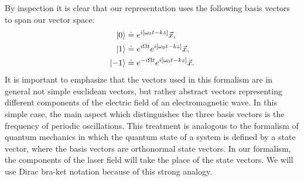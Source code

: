 By inspection it is clear that our representation uses the following basis vectors to span our vector space:
\begin{align}
\left| 0 \right>&\doteq e^{i[\omega_0 t-kz]}\vec{x}\notag, \\
\left| 1 \right>&\doteq e^{i\Omega t}e^{i[\omega_0 t-kz]}\vec{x}, \\
\left| -1 \right>&\doteq e^{-i\Omega t}e^{i[\omega_0 t-kz]}\vec{x}\notag.
\end{align}
It is important to emphasize that the vectors used in this formalism are in general not simple euclidean vectors, but rather abstract vectors representing different components of the electric field of an electromagnetic wave. %
In this simple case, the main aspect which distinguishes the three basis vectors is the frequency of periodic oscillations. %
This treatment is analogous to the formalism of quantum mechanics in which the quantum state of a system is defined by a state vector, where the basis vectors are orthonormal state vectors. %
In our formalism, the components of the laser field will take the place of the state vectors. %
We will use Dirac bra-ket notation because of this strong analogy.

